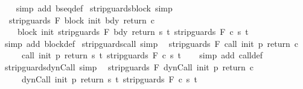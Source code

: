 \begin{isabellebody}
%
\isadelimproof
\ \ %
\endisadelimproof
%
\isatagproof
{}\isamarkupfalse%
\ {\isacharparenleft}simp\ add{\isacharcolon}\ bseq{\isacharunderscore}def{\isacharparenright}%
\endisatagproof
{\isafoldproof}%
%
\isadelimproof
\isanewline
%
\endisadelimproof
\isanewline
{}\isamarkupfalse%
\ strip{\isacharunderscore}guards{\isacharunderscore}block\ {\isacharbrackleft}simp{\isacharbrackright}{\isacharcolon}\isanewline
\ \ {\isachardoublequoteopen}strip{\isacharunderscore}guards\ F\ {\isacharparenleft}block\ init\ bdy\ return\ c{\isacharparenright}\ {\isacharequal}\isanewline
\ \ \ \ block\ init\ {\isacharparenleft}strip{\isacharunderscore}guards\ F\ bdy{\isacharparenright}\ return\ {\isacharparenleft}{\isasymlambda}s\ t{\isachardot}\ strip{\isacharunderscore}guards\ F\ {\isacharparenleft}c\ s\ t{\isacharparenright}{\isacharparenright}{\isachardoublequoteclose}\isanewline
%
\isadelimproof
\ \ %
\endisadelimproof
%
\isatagproof
{}\isamarkupfalse%
\ {\isacharparenleft}simp\ add{\isacharcolon}\ block{\isacharunderscore}def{\isacharparenright}%
\endisatagproof
{\isafoldproof}%
%
\isadelimproof
\isanewline
%
\endisadelimproof
\isanewline
{}\isamarkupfalse%
\ strip{\isacharunderscore}guards{\isacharunderscore}call\ {\isacharbrackleft}simp{\isacharbrackright}{\isacharcolon}\isanewline
\ \ {\isachardoublequoteopen}strip{\isacharunderscore}guards\ F\ {\isacharparenleft}call\ init\ p\ return\ c{\isacharparenright}\ {\isacharequal}\isanewline
\ \ \ \ \ call\ init\ p\ return\ {\isacharparenleft}{\isasymlambda}s\ t{\isachardot}\ strip{\isacharunderscore}guards\ F\ {\isacharparenleft}c\ s\ t{\isacharparenright}{\isacharparenright}{\isachardoublequoteclose}\isanewline
%
\isadelimproof
\ \ %
\endisadelimproof
%
\isatagproof
{}\isamarkupfalse%
\ {\isacharparenleft}simp\ add{\isacharcolon}\ call{\isacharunderscore}def{\isacharparenright}%
\endisatagproof
{\isafoldproof}%
%
\isadelimproof
\isanewline
%
\endisadelimproof
\isanewline
{}\isamarkupfalse%
\ strip{\isacharunderscore}guards{\isacharunderscore}dynCall\ {\isacharbrackleft}simp{\isacharbrackright}{\isacharcolon}\isanewline
\ \ {\isachardoublequoteopen}strip{\isacharunderscore}guards\ F\ {\isacharparenleft}dynCall\ init\ p\ return\ c{\isacharparenright}\ {\isacharequal}\isanewline
\ \ \ \ \ dynCall\ init\ p\ return\ {\isacharparenleft}{\isasymlambda}s\ t{\isachardot}\ strip{\isacharunderscore}guards\ F\ {\isacharparenleft}c\ s\ t{\isacharparenright}{\isacharparenright}{\isachardoublequoteclose}\isanewline
%
\isadelimproof
\ \ %
\endisadelimproof

\end{isabellebody}
